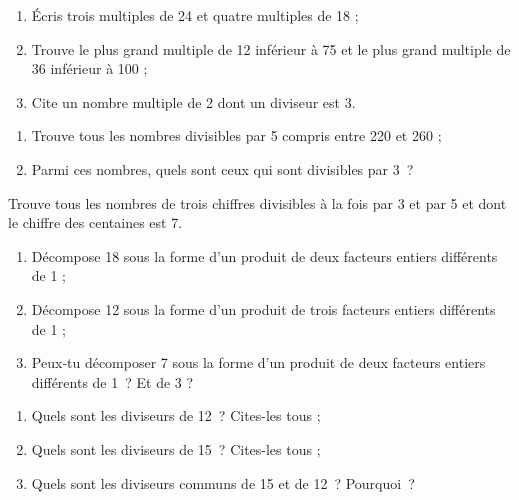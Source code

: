 \begin{exercice}
\begin{enumerate}
 \item Écris trois multiples de 24 et quatre multiples de 18 ;
 \item Trouve le plus grand multiple de 12 inférieur à 75 et le plus grand multiple de 36 inférieur à 100 ;
 \item Cite un nombre multiple de 2 dont un  diviseur est 3.
 \end{enumerate}
\end{exercice} 

\begin{exercice}[Liste]
\begin{enumerate}
 \item Trouve tous les nombres divisibles par 5 compris entre 220 et 260 ;
 \item Parmi ces nombres, quels sont ceux qui sont divisibles par 3 ?
 \end{enumerate}
\end{exercice} 

\begin{exercice}[Énigme]
Trouve tous les nombres de trois chiffres divisibles à la fois par 3 et par 5 et dont le chiffre des centaines est 7.
\end{exercice} 

\begin{exercice}[Décompositions]
\begin{enumerate}
 \item Décompose 18 sous la forme d'un produit de deux facteurs entiers différents de 1 ;
 \item Décompose 12 sous la forme d'un produit de trois facteurs entiers différents de 1 ;
 \item Peux‑tu décomposer 7 sous la forme d'un produit de deux facteurs entiers différents de 1 ? Et de 3 ?
 \end{enumerate}
\end{exercice} 

\begin{exercice}
\begin{enumerate}
 \item Quels sont les diviseurs de 12 ? Cites-les tous ;
 \item Quels sont les diviseurs de 15 ? Cites-les tous ;
 \item Quels sont les diviseurs communs de 15 et de 12 ? Pourquoi ?
 \end{enumerate}
\end{exercice} 

